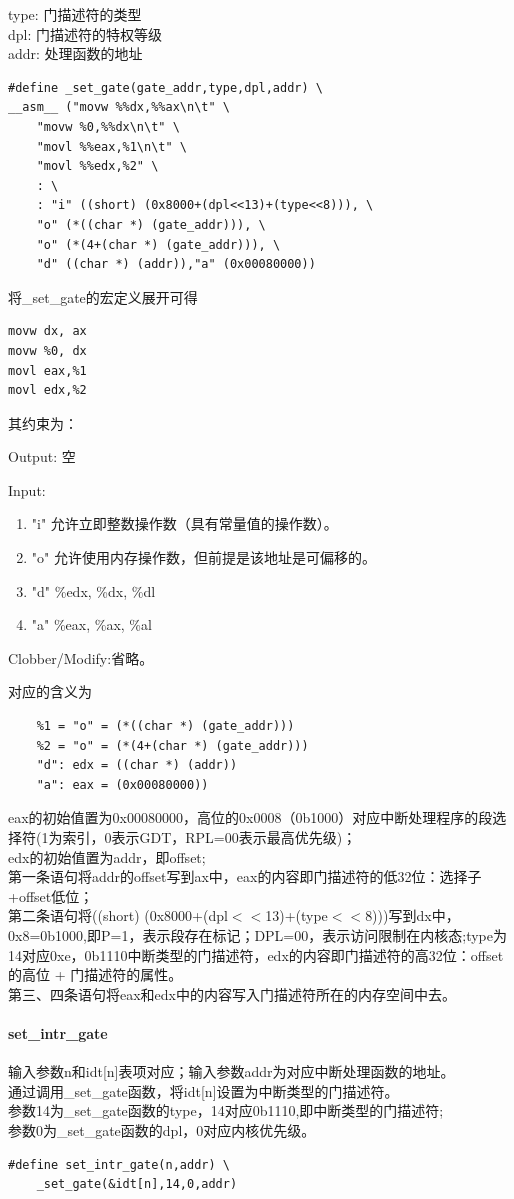 \documentclass[12pt]{article}
\begin{document}
type: 门描述符的类型\\
dpl: 门描述符的特权等级\\
addr: 处理函数的地址\\
\begin{lstlisting}[breaklines]
#define _set_gate(gate_addr,type,dpl,addr) \
__asm__ ("movw %%dx,%%ax\n\t" \
	"movw %0,%%dx\n\t" \
	"movl %%eax,%1\n\t" \
	"movl %%edx,%2" \
	: \
	: "i" ((short) (0x8000+(dpl<<13)+(type<<8))), \
	"o" (*((char *) (gate_addr))), \
	"o" (*(4+(char *) (gate_addr))), \
	"d" ((char *) (addr)),"a" (0x00080000))
\end{lstlisting}
将\_set\_gate的宏定义展开可得
\begin{lstlisting}[breaklines]
movw dx, ax
movw %0, dx
movl eax,%1
movl edx,%2
\end{lstlisting}
其约束为：
\begin{list}{•}{•}
\item Output: 空
\item Input: 
\begin{enumerate}
\item "i" 允许立即整数操作数（具有常量值的操作数）。
\item "o" 允许使用内存操作数，但前提是该地址是可偏移的。
\item "d" \%edx, \%dx, \%dl
\item "a" \%eax, \%ax, \%al
\end{enumerate}
\item Clobber/Modify:省略。
\end{list}
对应的含义为
\begin{lstlisting}[breaklines]
	%0 = "i" = ((short) (0x8000+(dpl<<13)+(type<<8)))
	%1 = "o" = (*((char *) (gate_addr)))
	%2 = "o" = (*(4+(char *) (gate_addr)))
	"d": edx = ((char *) (addr))
	"a": eax = (0x00080000))
\end{lstlisting}
eax的初始值置为0x00080000，高位的0x0008（0b1000）对应中断处理程序的段选择符(1为索引，0表示GDT，RPL=00表示最高优先级)；\\
edx的初始值置为addr，即offset;\\
第一条语句将addr的offset写到ax中，eax的内容即门描述符的低32位：选择子+offset低位；\\
第二条语句将((short) (0x8000+(dpl$<<$13)+(type$<<$8)))写到dx中，0x8=0b1000,即P=1，表示段存在标记；DPL=00，表示访问限制在内核态;type为14对应0xe，0b1110中断类型的门描述符，edx的内容即门描述符的高32位：offset的高位 + 门描述符的属性。\\
第三、四条语句将eax和edx中的内容写入门描述符所在的内存空间中去。
\paragraph{set\_intr\_gate}	
输入参数n和idt[n]表项对应；输入参数addr为对应中断处理函数的地址。\\
通过调用\_set\_gate函数，将idt[n]设置为中断类型的门描述符。\\
参数14为\_set\_gate函数的type，14对应0b1110,即中断类型的门描述符;\\
参数0为\_set\_gate函数的dpl，0对应内核优先级。
\begin{lstlisting}[breaklines]
#define set_intr_gate(n,addr) \
	_set_gate(&idt[n],14,0,addr)
\end{lstlisting}
\end{document}
